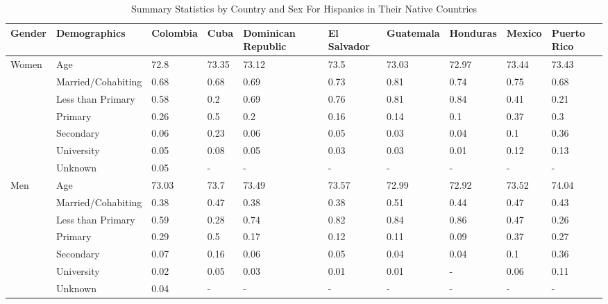 \documentclass[
]{article}
\begin{document}
\begin{landscape}
\begin{table}[h!]
\centering
\caption{Summary Statistics by Country and Sex For Hispanics in Their Native Countries} 

\begingroup\small
\begin{tabular}{l|l|llllllll}
  \hline
Gender & Demographics & Colombia & Cuba & Dominican Republic & El Salvador & Guatemala & Honduras & Mexico & Puerto Rico \\ 
  \hline
Women & Age & 72.8 & 73.35 & 73.12 & 73.5 & 73.03 & 72.97 & 73.44 & 73.43 \\ 
   & Married/Cohabiting & 0.68 & 0.68 & 0.69 & 0.73 & 0.81 & 0.74 & 0.75 & 0.68 \\ 
   & Less than Primary & 0.58 & 0.2 & 0.69 & 0.76 & 0.81 & 0.84 & 0.41 & 0.21 \\ 
   & Primary & 0.26 & 0.5 & 0.2 & 0.16 & 0.14 & 0.1 & 0.37 & 0.3 \\ 
   & Secondary & 0.06 & 0.23 & 0.06 & 0.05 & 0.03 & 0.04 & 0.1 & 0.36 \\ 
   & University & 0.05 & 0.08 & 0.05 & 0.03 & 0.03 & 0.01 & 0.12 & 0.13 \\ 
   & Unknown & 0.05 & - & - & - & - & - & - & - \\ 
  Men & Age & 73.03 & 73.7 & 73.49 & 73.57 & 72.99 & 72.92 & 73.52 & 74.04 \\ 
   & Married/Cohabiting & 0.38 & 0.47 & 0.38 & 0.38 & 0.51 & 0.44 & 0.47 & 0.43 \\ 
   & Less than Primary & 0.59 & 0.28 & 0.74 & 0.82 & 0.84 & 0.86 & 0.47 & 0.26 \\ 
   & Primary & 0.29 & 0.5 & 0.17 & 0.12 & 0.11 & 0.09 & 0.37 & 0.27 \\ 
   & Secondary & 0.07 & 0.16 & 0.06 & 0.05 & 0.04 & 0.04 & 0.1 & 0.36 \\ 
   & University & 0.02 & 0.05 & 0.03 & 0.01 & 0.01 & - & 0.06 & 0.11 \\ 
   & Unknown & 0.04 & - & - & - & - & - & - & - \\ 
   \hline
\end{tabular}
\endgroup
\end{table}



\end{landscape}
\end{document}
